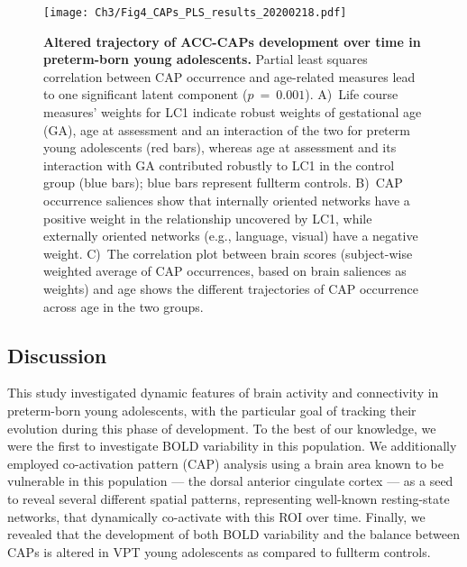 \begin{figure}[h]
\centering\texttt{[image: Ch3/Fig4\_CAPs\_PLS\_results\_20200218.pdf]}
\caption{\textbf{Altered trajectory of ACC-CAPs development over time in preterm-born young adolescents.} Partial least squares correlation between CAP occurrence and age-related measures lead to one significant latent component ($p~=~0.001$).   A)~Life course measures' weights for LC1  indicate robust weights of gestational age (GA), age at assessment and an interaction of the two for preterm young adolescents (red bars), whereas age at assessment and its interaction with GA contributed robustly to LC1 in the control group (blue bars); blue bars represent fullterm controls. B)~CAP occurrence saliences show that internally oriented networks have a positive weight in the relationship uncovered by LC1, while externally oriented networks (e.g., language, visual) have a negative weight.  C)~The correlation plot between brain scores (subject-wise weighted average of CAP occurrences, based on brain saliences as weights) and age shows the different trajectories of CAP occurrence across age in the two groups.} \label{fig:PLS_CAPs}
\end{figure}




\subsection{Discussion}

This study investigated dynamic features of brain activity and connectivity in preterm-born young adolescents, with the particular goal of tracking their evolution during this phase of development. To the best of our knowledge, we were the first to investigate BOLD variability in this population.  We additionally employed co-activation pattern (CAP) analysis using a brain area known to be vulnerable in this population --- the dorsal anterior cingulate cortex --- as a seed to reveal several different spatial patterns, representing well-known resting-state networks, that dynamically co-activate with this ROI over time. Finally, we revealed that the development of both BOLD variability and the balance between CAPs is altered in VPT young adolescents as compared to fullterm controls. 


